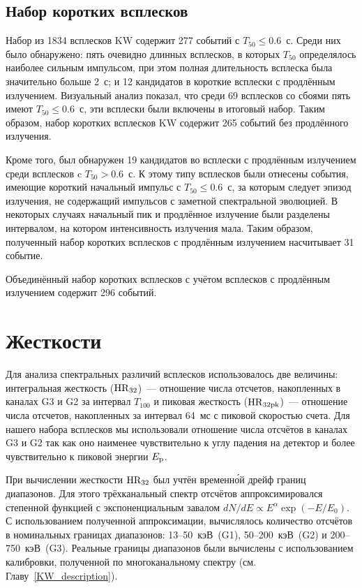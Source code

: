 \subsection{Набор коротких всплесков}
Набор из 1834 всплесков KW содержит 277 событий с $T_{50} \leq 0.6$~с.    %
Среди них было обнаружено: пять очевидно длинных всплесков, в которых $T_{50}$ 
определялось наиболее сильным импульсом, при этом полная длительность всплеска была 
значительно больше 2~с; и 12 кандидатов в короткие всплески с продлённым излучением.
Визуальный анализ показал, что среди 69 всплесков со сбоями пять имеют $T_{50} \leq 0.6$~с, 
эти всплески были включены в итоговый набор. 
Таким образом, набор коротких всплесков KW содержит 265 событий без продлённого излучения.

Кроме того, был обнаружен 19 кандидатов во всплески с продлённым излучением среди всплесков c $T_{50} > 0.6$~с. 
К этому типу всплесков были отнесены события, имеющие короткий начальный импульс с $T_{50} \leq 0.6$~с, 
за которым следует эпизод излучения, не содержащий импульсов с заметной спектральной эволюцией. 
В некоторых случаях начальный пик и продлённое излучение были разделены интервалом, 
на котором интенсивность излучения мала. Таким образом, полученный набор коротких всплесков с 
продлённым излучением насчитывает 31 событие.

Объединённый набор коротких всплесков с учётом всплесков с продлённым излучением 
содержит 296 событий.
\FloatBarrier

\section{Жесткости}\label{sec:Hardness}
Для анализа спектральных различий всплесков использовалось две величины: интегральная 
жесткость (${\mathrm{HR}}_{32}$)~--- отношение числа отсчетов, накопленных в каналах G3 и G2 
за интервал $T_{100}$ и пиковая жесткость (${\mathrm{HR}}_{32{\mathrm{pk}}}$)~--- отношение числа отсчетов, 
накопленных за интервал 64~мс с пиковой скоростью счета. Для нашего набора 
всплесков мы использовали отношение числа отсчётов в каналах G3 и G2 так как 
оно наименее чувствительно к углу падения на детектор и более чувствительно 
к пиковой энергии $E_{\mathrm{p}}$.  

При вычислении жесткости ${\mathrm{HR}}_{32}$ был учтён временн\'{о}й дрейф границ диапазонов. 
Для этого трёхканальный спектр отсчётов аппроксимировался степенной функцией 
с экспоненциальным завалом $dN/dE \propto E^{\alpha} \exp(-E/E_0)$. 
С использованием полученной аппроксимации, вычислялось количество отсчётов в номинальных 
границах диапазонов: 13--50~кэВ~(G1), 50--200~кэВ~(G2) и 200--750~кэВ~(G3). 
Реальные границы диапазонов были вычислены с использованием калибровки, полученной 
по многоканальному спектру (см. Главу~\ref{KW_description}).

